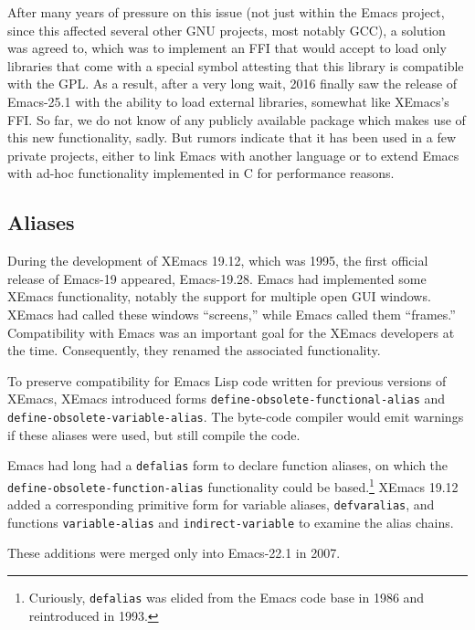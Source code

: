\documentclass[format=acmsmall, review]{acmart}
\newcommand \Elisp {Emacs Lisp}
\begin{document}
After many years of pressure on this issue (not just within the Emacs
project, since this affected several other GNU projects, most notably GCC),
a solution was agreed to, which was to implement an FFI that would accept
to load only libraries that come with a special symbol attesting that this
library is compatible with the GPL.  As a result, after a very long wait,
2016 finally saw the release of Emacs-25.1 with the ability to load external
libraries, somewhat like XEmacs's FFI.  So far, we do not know of any publicly
available package which makes use of this new functionality, sadly.
But rumors indicate that it has been used in a few private projects, either
to link Emacs with another language or to extend Emacs with ad-hoc
functionality implemented in C for performance reasons.

\subsection{Aliases}

During the development of XEmacs 19.12, which was 1995, the first
official release of Emacs-19 appeared, Emacs-19.28.  Emacs had
implemented some XEmacs functionality, notably the support for
multiple open GUI windows.  XEmacs had called these windows
``screens,'' while Emacs called them ``frames.''  Compatibility with
Emacs was an important goal for the XEmacs developers at the time.
Consequently, they renamed the associated functionality.

To preserve compatibility for \Elisp{} code written for previous
versions of XEmacs, XEmacs introduced forms
\texttt{define-obsolete-functional-alias} and
\texttt{define-obsolete-variable-alias}.  The byte-code compiler would
emit warnings if these aliases were used, but still compile the code.

Emacs had long had a \texttt{defalias} form to declare function
aliases, on which the \texttt{define-\linebreak[0]obsolete-\linebreak[0]function-\linebreak[0]alias}
functionality could be based.\footnote{Curiously, \texttt{defalias}
  was elided from the Emacs code base in 1986 and reintroduced in
  1993.}  XEmacs 19.12 added a corresponding primitive form for variable
aliases, \texttt{defvaralias}, and functions \texttt{variable-alias}
and \texttt{indirect-variable} to examine the alias chains.

These additions were merged only into Emacs-22.1 in 2007.
\end{document}

